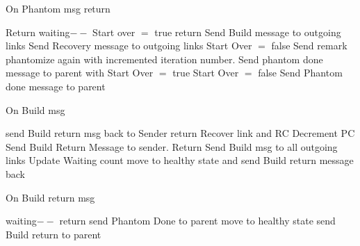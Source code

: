 \documentclass{article}
\begin{document}
	
\begin{algorithm}
\caption{On Phantom msg return}
\label{Phantom Done message received}
\begin{algorithmic}[1]
\State Return
\EndIf
\State waiting$--$
\State Start over $=$ true
\EndIf
{}
\State return
\EndIf
{}
\State Send Build message to outgoing links
\State Send Recovery message to outgoing links
\State Start Over $=$ false
\State Send remark phantomize again with incremented iteration number.
\State Send phantom done message to parent with Start Over $=$ true
\State Start Over $=$ false
\Else
\State Send Phantom done message to parent
\EndIf
\EndProcedure
\end{algorithmic}
\end{algorithm}	


	
\begin{algorithm}
\caption{On Build msg}
\label{Build message received}
\begin{algorithmic}[1]
\State send Build return msg back to Sender
\State return
\EndIf
\State Recover link and RC
\State Decrement PC
\State Send Build Return Message to sender.
\State Return
\EndIf
\State Send Build msg to all outgoing links
\State Update Waiting count
\State move to healthy state and send Build return message back
\EndIf
\EndProcedure
\end{algorithmic}
\end{algorithm}	



\begin{algorithm}
\caption{On Build return msg}
\label{Build return message received}
\begin{algorithmic}[1]
\State waiting$--$
\State return
\EndIf
{}
\State send Phantom Done to parent
\Else
\State move to healthy state
\State send Build return to parent
\EndIf
\EndIf
\EndProcedure
\end{algorithmic}
\end{algorithm}	
\end{document}
